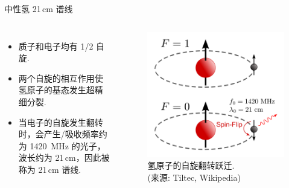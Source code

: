 \documentclass{beamer}
\begin{document}
\begin{frame}{中性氢 21\,cm 谱线}
  \begin{columns}
    \begin{itemize}
      \item 质子和电子均有 1/2 自旋.
      \item 两个自旋的相互作用使氢原子的基态发生\alert{超精细分裂}.
      \item 当电子的自旋发生翻转时，会产生/吸收频率约为 \SI{1420}{\MHz} 的光子，
        波长约为 21\,cm，因此被称为 \alert{21\,cm 谱线}.
    \end{itemize}

    \begin{figure}
      \centering
      \includegraphics[width=\columnwidth]{hydrogen-spinflip}
      \caption{氢原子的自旋翻转跃迁. \\
        (来源: Tiltec, Wikipedia)}
    \end{figure}
  \end{columns}
\end{frame}
\end{document}
